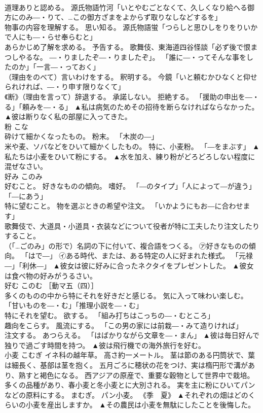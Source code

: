 \documentclass[8pt]{extreport}
\begin{document}
\begin{CJK}{UTF8}{min}
\\	道理ありと認める。 源氏物語竹河「いとやむごとなくて、久しくなり給へる御方にのみ―・りて、…この御方ざまをよからず取りなしなどするを」 
\\	物事の内容を理解する。 思い知る。 源氏物語蛍「つらしと思ひしをりをりいかで人にも―・らせ奉らむと」 
\\	あらかじめ了解を求める。 予告する。 歌舞伎、東海道四谷怪談「必ず後で恨まつしやるな。 ―・りましたぞ―・りましたぞ」。 「誰に―・ってそんな事をしたのか」「一言―・っておく」 
\\	（理由をのべて）言いわけをする。 釈明する。 今鏡「いと頼むかひなくと仰せられければ、―・り申す限りなくて」 
\\	《断》（理由を言って）辞退する。 承諾しない。 拒絶する。 「援助の申出を―・る」「頼みを―・る」	▲私は病気のためその招待を断らなければならなかった。 ▲彼は断りなく私の部屋に入ってきた。
\\	粉	こな	
\\	砕けて細かくなったもの。 粉末。 「木炭の―」 
\\	米や麦、ソバなどをひいて細かくしたもの。 特に、小麦粉。 「―をまぶす」	▲私たちは小麦をひいて粉にする。 ▲水を加え、練り粉がどろどろしない程度に混ぜなさい。
\\	好み	このみ	
\\	好むこと。 好きなものの傾向。 嗜好。 「―のタイプ」「人によって―が違う」「―にあう」 
\\	特に望むこと。 物を選ぶときの希望や注文。 「いかようにもお―に合わせます」 
\\	歌舞伎で、大道具・小道具・衣装などについて役者が特に工夫したり注文したりすること。 
\\	（「…ごのみ」の形で）名詞の下に付いて、複合語をつくる。 ㋐好きなものの傾向。 「はで―」 ㋑ある時代、または、ある特定の人に好まれた様式。 「元禄―」「利休―」	▲彼女は彼に好みに合ったネクタイをプレゼントした。 ▲彼女は食べ物の好みがうるさい。
\\	好む	このむ	［動マ五（四）］ 
\\	多くのものの中から特にそれを好きだと感じる。 気に入って味わい楽しむ。 「甘いものを―・む」「推理小説を―・む」 
\\	特にそれを望む。 欲する。 「組み打ちはこっちの―・むところ」 
\\	趣向をこらす。 風流にする。 「この男の家には前栽―・みて造りければ」 
\\	注文する。 あつらえる。 「はばかりながら文章を―・まん」	▲彼は毎日好んで独りで過ごす時間を持つ。 ▲彼は飛行機での海外旅行を好む。
\\	小麦	こむぎ	イネ科の越年草。 高さ約一メートル。 茎は節のある円筒状で、葉は細長く、基部は茎を抱く。 五月ごろに穂状の花をつけ、実は楕円形で溝があり、熟すと褐色になる。 西アジアの原産で、重要な穀物として世界中で栽培。 多くの品種があり、春小麦と冬小麦とに大別される。 実を主に粉にひいてパンなどの原料にする。 まむぎ。 パン小麦。 《季　夏》	▲それぞれの畑はどのくらいの小麦を産出しますか。 ▲その農民は小麦を無駄にしたことを後悔した。

\end{CJK}
\end{document}
